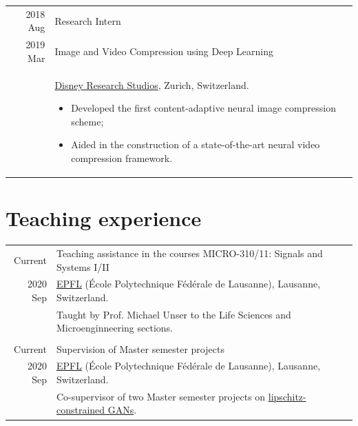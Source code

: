 \documentclass[a4paper,11pt]{article}
\begin{document}
\begin{tabular}{r|p{13cm}}
      2018 Aug & Research Intern \\
      2019 Mar & Image and Video Compression using Deep Learning \\
				& \footnotesize{\href{https://studios.disneyresearch.com/}{Disney Research Studios}, Zurich, Switzerland.}
        \begin{itemize}[leftmargin=*,noitemsep]
          \item \footnotesize{
            Developed the first content-adaptive neural image compression scheme;}
          \item  \footnotesize{
            Aided in the construction of a state-of-the-art neural video compression framework.}
          \end{itemize} \vspace*{-\baselineskip}

    \end{tabular}

  

  \vspace{18pt}

  \section{Teaching experience}

    \begin{tabular}{r|p{13cm}}

	  Current & Teaching assistance in the courses MICRO-310/11: Signals and Systems I/II \\
	  2020 Sep & \footnotesize{\href{https://www.epfl.ch/en/}{EPFL} (École Polytechnique Fédérale de Lausanne), Lausanne, Switzerland.} \\
    & \footnotesize{Taught by Prof. Michael Unser to the Life Sciences and Microenginneering sections.} \\

    \multicolumn{2}{c}{} \\

    Current & Supervision of Master semester projects \\
    2020 Sep & \footnotesize{\href{https://www.epfl.ch/en/}{EPFL} (École Polytechnique Fédérale de Lausanne), Lausanne, Switzerland.} \\
    & \footnotesize{Co-supervisor of two Master semester projects on \href{https://bigwww.epfl.ch/teaching/projects/abstract.html?f=00388}{lipschitz-constrained GANs}.} \\

    \end{tabular}
\end{document}
